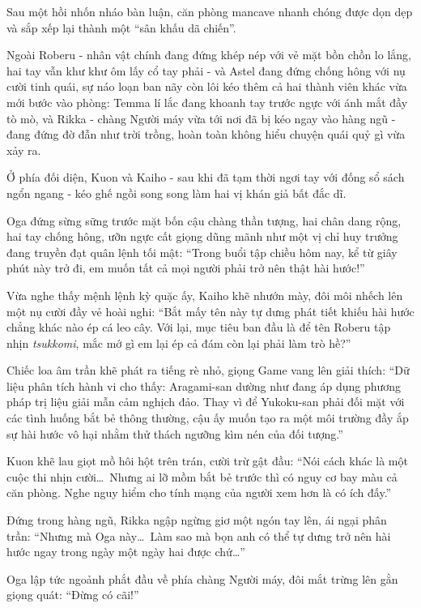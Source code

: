 \documentclass[../main.tex]{subfiles}
\begin{document}
\ct

Sau một hồi nhốn nháo bàn luận, căn phòng mancave nhanh chóng được dọn dẹp và sắp xếp lại thành một ``sân khấu dã chiến''.

Ngoài Roberu - nhân vật chính đang đứng khép nép với vẻ mặt bồn chồn lo lắng, hai tay vẫn khư khư ôm lấy cổ tay phải - và Astel đang đứng chống hông với nụ cười tinh quái, sự náo loạn ban nãy còn lôi kéo thêm cả hai thành viên khác vừa mới bước vào phòng: Temma lí lắc đang khoanh tay trước ngực với ánh mắt đầy tò mò, và Rikka - chàng Người máy vừa tới nơi đã bị kéo ngay vào hàng ngũ - đang đứng đờ đẫn như trời trồng, hoàn toàn không hiểu chuyện quái quỷ gì vừa xảy ra.


Ở phía đối diện, Kuon và Kaiho - sau khi đã tạm thời ngơi tay với đống sổ sách ngổn ngang - kéo ghế ngồi song song làm hai vị khán giả bất đắc dĩ.

Oga đứng sừng sững trước mặt bốn cậu chàng thần tượng, hai chân dang rộng, hai tay chống hông, ưỡn ngực cất giọng dũng mãnh như một vị chỉ huy trưởng đang truyền đạt quân lệnh tối mật: ``Trong buổi tập chiều hôm nay, kể từ giây phút này trở đi, em muốn tất cả mọi người phải trở nên thật hài hước!''

Vừa nghe thấy mệnh lệnh kỳ quặc ấy, Kaiho khẽ nhướn mày, đôi môi nhếch lên một nụ cười đầy vẻ hoài nghi: ``Bắt mấy tên này tự dưng phát tiết khiếu hài hước chẳng khác nào ép cá leo cây. Với lại, mục tiêu ban đầu là để tên Roberu tập nhịn \textit{tsukkomi}, mắc mớ gì em lại ép cả đám còn lại phải làm trò hề?''

Chiếc loa âm trần khẽ phát ra tiếng rè nhỏ, giọng Game vang lên giải thích: ``Dữ liệu phân tích hành vi cho thấy: Aragami-san dường như đang áp dụng phương pháp trị liệu giải mẫn cảm nghịch đảo. Thay vì để Yukoku-san phải đối mặt với các tình huống bắt bẻ thông thường, cậu ấy muốn tạo ra một môi trường đầy ắp sự hài hước vô hại nhằm thử thách ngưỡng kìm nén của đối tượng.''

Kuon khẽ lau giọt mồ hôi hột trên trán, cười trừ gật đầu: ``Nói cách khác là một cuộc thi nhịn cười\dots\ Nhưng ai lỡ mồm bắt bẻ trước thì có nguy cơ bay màu cả căn phòng. Nghe nguy hiểm cho tính mạng của người xem hơn là có ích đấy.''

Đứng trong hàng ngũ, Rikka ngập ngừng giơ một ngón tay lên, ái ngại phân trần: ``Nhưng mà Oga này\dots\ Làm sao mà bọn anh có thể tự dưng trở nên hài hước ngay trong ngày một ngày hai được chứ\dots''

Oga lập tức ngoảnh phắt đầu về phía chàng Người máy, đôi mắt trừng lên gằn giọng quát: ``Đừng có cãi!''
\end{document}
